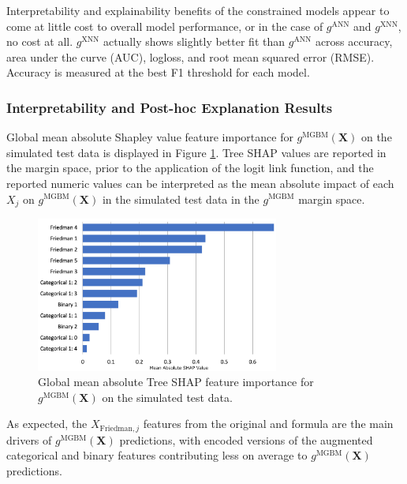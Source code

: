 \documentclass[information,article,submit,moreauthors,pdftex]{definitions/mdpi}
\begin{document}
\noindent Interpretability and explainability benefits of the constrained models appear to come at little cost to overall model performance, or in the case of $g^\text{ANN}$ and $g^\text{XNN}$, no cost at all. $g^\text{XNN}$ actually shows slightly better fit than $g^\text{ANN}$ across accuracy, area under the curve (AUC), logloss, and root mean squared error (RMSE). Accuracy is measured at the best F1 threshold for each model.

\subsubsection{Interpretability and Post-hoc Explanation Results}\label{ssec:int_ex_sim}

Global mean absolute Shapley value feature importance for $g^{\text{MGBM}}(\mathbf{X})$ on the simulated test data is displayed in Figure \ref{fig:sim_mgbm_glob}. Tree SHAP values are reported in the margin space, prior to the application of the logit link function, and the reported numeric values can be interpreted as the mean absolute impact of each $X_j$ on $g^\text{MGBM}(\mathbf{X})$ in the simulated test data in the $g^\text{MGBM}$ margin space. 

\begin{figure}[H]
\centering
\includegraphics[width=8cm]{img/sim_mgbm_glob.png}
\caption{Global mean absolute Tree SHAP feature importance for $g^\text{MGBM}(\mathbf{X})$ on the simulated test data.}
\label{fig:sim_mgbm_glob}
\end{figure}   

\noindent As expected, the $X_{\text{Friedman},j}$ features from the original \citet{friedman1979tree} and \citet{friedman1991multivariate} formula are the main drivers of $g^\text{MGBM}(\mathbf{X})$ predictions, with encoded versions of the augmented categorical and binary features contributing less on average to $g^\text{MGBM}(\mathbf{X})$ predictions. 
\end{document}
